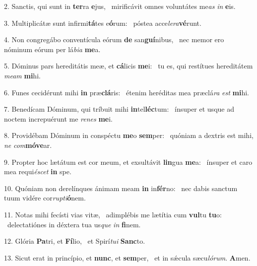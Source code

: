 2. Sanctis, qui sunt in \textbf{ter}ra \textbf{e}jus, \ast\  mirificávit omnes voluntátes me\textit{as} \textit{in} \textbf{e}is.\

3. Multiplicátæ sunt infirmi\textbf{tá}tes e\textbf{ó}rum: \ast\  póstea acce\textit{le}\textit{ra}\textbf{vé}runt.\

4. Non congregábo conventícula eórum \textbf{de} san\textbf{guí}nibus, \ast\  nec memor ero nóminum eórum per lá\textit{bi}\textit{a} \textbf{me}a.\

5. Dóminus pars hereditátis meæ, et \textbf{cá}licis \textbf{me}i: \ast\  tu es, qui restítues hereditátem \textit{me}\textit{am} \textbf{mi}hi.\

6. Funes cecidérunt mihi \textbf{in} præ\textbf{clá}ris: \ast\  étenim heréditas mea præclá\textit{ra} \textit{est} \textbf{mi}hi.\

7. Benedícam Dóminum, qui tríbuit mihi \textbf{in}tel\textbf{léc}tum: \ast\  ínsuper et usque ad noctem increpuérunt me \textit{re}\textit{nes} \textbf{me}i.\

8. Providébam Dóminum in conspéctu \textbf{me}o \textbf{sem}per: \ast\  quóniam a dextris est mihi, \textit{ne} \textit{com}\textbf{mó}\textbf{ve}ar.\

9. Propter hoc lætátum est cor meum, et exsultávit \textbf{lin}gua \textbf{me}a: \ast\  ínsuper et caro mea requi\textit{é}\textit{scet} \textbf{in} spe.\

10. Quóniam non derelínques ánimam meam \textbf{in} in\textbf{fér}no: \ast\  nec dabis sanctum tuum vidére cor\textit{rup}\textit{ti}\textbf{ó}nem.\

11. Notas mihi fecísti vias vitæ, \dag\  adimplébis me lætítia cum \textbf{vul}tu \textbf{tu}o: \ast\  delectatiónes in déxtera tua us\textit{que} \textit{in} \textbf{fi}nem.\

12. Glória \textbf{Pa}tri, et \textbf{Fí}lio, \ast\  et Spirí\textit{tu}\textit{i} \textbf{Sanc}to.\

13. Sicut erat in princípio, et \textbf{nunc}, et \textbf{sem}per, \ast\  et in sǽcula sæcu\textit{ló}\textit{rum}. \textbf{A}men.\

